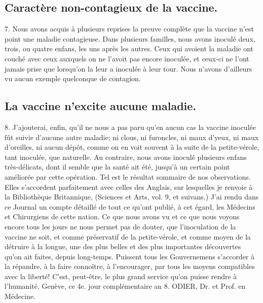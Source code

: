 \subsection{Caractère non-contagieux de la vaccine.}
7. Nous avons acquis à plusieurs reprises la preuve complète que la vaccine n'est point une maladie contagieuse. Dans plusieurs familles, nous avons inoculé deux, trois, ou quatre enfans, les uns après les autres. Ceux qui avoient la maladie ont couché avec ceux auxquels on ne l'avoit pas encore inoculée, et ceux-ci ne l'ont jamais prise que lorsqu'on la leur a inoculée à leur tour. Nous n'avons d'ailleurs vu aucun exemple quelconque de contagion.
\subsection{La vaccine n'excite aucune maladie.}
8. J'ajouterai, enfin, qu'il ne nous a pas paru qu'en aucun cas la vaccine inoculée fût suivie d'aucune autre maladie; ni clous, ni furoncles, ni maux d'yeux, ni maux d'oreilles, ni aucun dépôt, comme on en voit souvent à la suite de la petite-vérole, tant inoculée, que naturelle. Au contraire, nous avons\setcounter{page}{89} inoculé plusieurs enfans très-délicats, dont il semble que la santé ait été, jusqu'à un certain point améliorée par cette opération. Tel est le résultat sommaire de nos observations. Elles s'accordent parfaitement avec celles des Anglais, sur lesquelles je renvoie à la Bibliothèque Britannique, (Sciences et Arts, vol. 9, et suivans.) J'ai rendu dans ce Journal un compte détaillé de tout ce qu'ont publié, à cet égard, les Médecins et Chirurgiens de cette nation. Ce que nous avons vu et ce que nous voyons encore tous les jours ne nous permet pas de douter, que l'inoculation de la vaccine ne soit, et comme préservatif de la petite-vérole, et comme moyen de la détruire à la longue, une des plus belles et des plus importantes découvertes qu'on ait faites, depuis long-temps. Puissent tous les Gouvernemens s'accorder à la répandre, à la faire connoître, à l'encourager, par tous les moyens compatibles avec la liberté! C'est, peut-être, le plus grand service qu'on puisse rendre à l'humanité.
Genève, ce 4e. jour complémentaire an 8.
ODIER, Dr. et Prof.
en Médecine.
